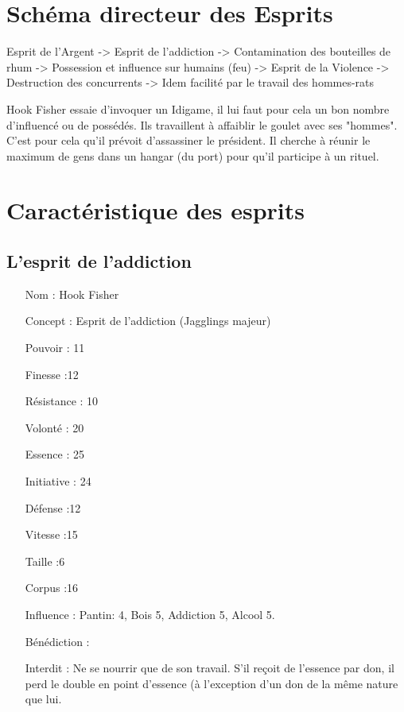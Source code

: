 \documentclass[oneside,12pt]{book}
\begin{document}
\begin{flushleft}
\section{Schéma directeur des Esprits}
Esprit de l'Argent 	-> Esprit de l'addiction	-> Contamination des bouteilles de rhum 	-> Possession et influence sur humains
(feu)			-> Esprit de la Violence	-> Destruction des concurrents			-> Idem facilité par le travail des hommes-rats

Hook Fisher essaie d'invoquer un Idigame, il lui faut pour cela un bon nombre d'influencé ou de possédés. Ils travaillent à affaiblir le goulet avec ses "hommes". C'est pour cela qu'il prévoit d'assassiner le président. Il cherche à réunir le maximum de gens dans un hangar (du port) pour qu'il participe à un rituel. 
\section{Caractéristique des esprits}
\subsection{L'esprit de l'addiction}
\begin{itemize}
\item[Nom]: Hook Fisher
\item[Concept]: Esprit de l'addiction (Jagglings majeur)
\item[Pouvoir]: 11
\item[Finesse]:12
\item[Résistance]: 10
\item[Volonté]: 20
\item[Essence]: 25
\item[Initiative]: 24
\item[Défense]:12
\item[Vitesse]:15
\item[Taille]:6
\item[Corpus]:16
\item[Influence]: Pantin: 4, Bois 5, Addiction 5, Alcool 5.
\item[Bénédiction]: 
\item[Interdit]: Ne se nourrir que de son travail. S'il reçoit de l'essence par don, il perd le double en point d'essence (à l'exception d'un don de la même nature que lui.
\end{itemize}

\end{flushleft}
\end{document}
